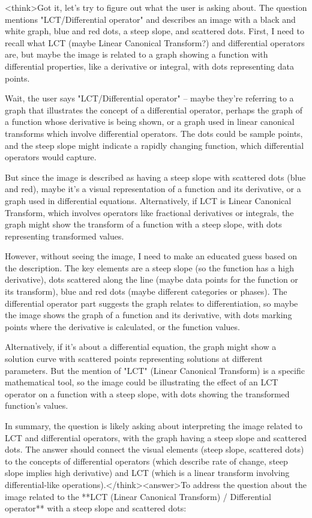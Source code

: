 <think>Got it, let's try to figure out what the user is asking about. The question mentions "LCT/Differential operator" and describes an image with a black and white graph, blue and red dots, a steep slope, and scattered dots. First, I need to recall what LCT (maybe Linear Canonical Transform?) and differential operators are, but maybe the image is related to a graph showing a function with differential properties, like a derivative or integral, with dots representing data points.

Wait, the user says "LCT/Differential operator" – maybe they're referring to a graph that illustrates the concept of a differential operator, perhaps the graph of a function whose derivative is being shown, or a graph used in linear canonical transforms which involve differential operators. The dots could be sample points, and the steep slope might indicate a rapidly changing function, which differential operators would capture.

But since the image is described as having a steep slope with scattered dots (blue and red), maybe it's a visual representation of a function and its derivative, or a graph used in differential equations. Alternatively, if LCT is Linear Canonical Transform, which involves operators like fractional derivatives or integrals, the graph might show the transform of a function with a steep slope, with dots representing transformed values.

However, without seeing the image, I need to make an educated guess based on the description. The key elements are a steep slope (so the function has a high derivative), dots scattered along the line (maybe data points for the function or its transform), blue and red dots (maybe different categories or phases). The differential operator part suggests the graph relates to differentiation, so maybe the image shows the graph of a function and its derivative, with dots marking points where the derivative is calculated, or the function values.

Alternatively, if it's about a differential equation, the graph might show a solution curve with scattered points representing solutions at different parameters. But the mention of "LCT" (Linear Canonical Transform) is a specific mathematical tool, so the image could be illustrating the effect of an LCT operator on a function with a steep slope, with dots showing the transformed function's values.

In summary, the question is likely asking about interpreting the image related to LCT and differential operators, with the graph having a steep slope and scattered dots. The answer should connect the visual elements (steep slope, scattered dots) to the concepts of differential operators (which describe rate of change, steep slope implies high derivative) and LCT (which is a linear transform involving differential-like operations).</think><answer>To address the question about the image related to the **LCT (Linear Canonical Transform) / Differential operator** with a steep slope and scattered dots:  

